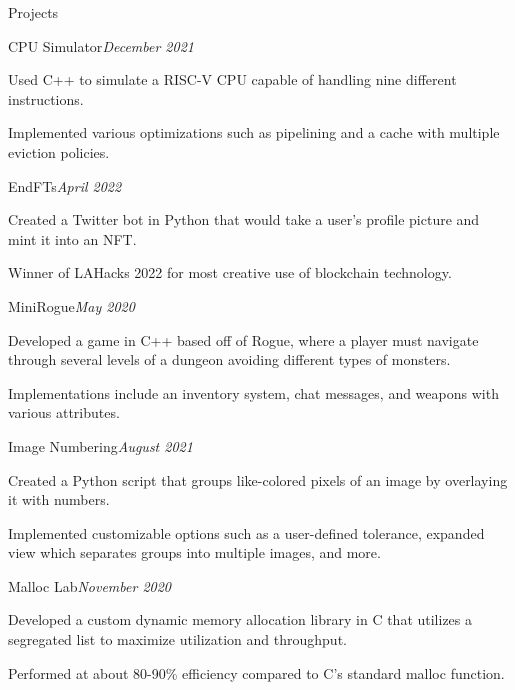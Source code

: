 \documentclass{resume} %
\begin{document}

\begin{rSection}{Projects}

\begin{rSubsection}{CPU Simulator}{\em December 2021}{}{}
\item Used C++ to simulate a RISC-V CPU capable of handling nine different instructions.
\item Implemented various optimizations such as pipelining and a cache with multiple eviction policies.
\end{rSubsection}

\begin{rSubsection}{EndFTs}{\em April 2022}{}{}
\item Created a Twitter bot in Python that would take a user's profile picture and mint it into an NFT.
\item Winner of LAHacks 2022 for most creative use of blockchain technology.
\end{rSubsection}

\begin{rSubsection}{MiniRogue}{\em May 2020}{}{}
\item Developed a game in C++ based off of Rogue, where a player must navigate through several levels of a dungeon avoiding different types of monsters.
\item Implementations include an inventory system, chat messages, and weapons with various attributes.
\end{rSubsection}

\begin{rSubsection}{Image Numbering}{\em August 2021}{}{}
\item Created a Python script that groups like-colored pixels of an image by overlaying it with numbers.
\item Implemented customizable options such as a user-defined tolerance, expanded view which separates groups into multiple images, and more.
\end{rSubsection}

\begin{rSubsection}{Malloc Lab}{\em November 2020}{}{}
\item Developed a custom dynamic memory allocation library in C that utilizes a segregated list to maximize utilization and throughput.
\item Performed at about 80-90\% efficiency compared to C's standard malloc function.
\end{rSubsection}



\end{rSection}
\end{document}
